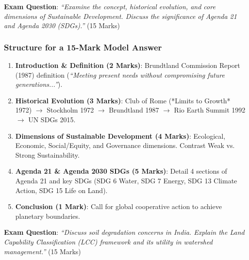 \documentclass[11pt,a4paper]{article}
\begin{document}
\begin{exambox}
\textbf{Exam Question}: \textit{``Examine the concept, historical evolution, and core dimensions of Sustainable Development. Discuss the significance of Agenda 21 and Agenda 2030 (SDGs).''} (15 Marks)
\end{exambox}

\subsubsection{Structure for a 15-Mark Model Answer}
\begin{enumerate}[leftmargin=*]
  \item \textbf{Introduction \& Definition (2 Marks)}: Brundtland Commission Report (1987) definition (\textit{``Meeting present needs without compromising future generations...''}).
  \item \textbf{Historical Evolution (3 Marks)}: Club of Rome (*Limits to Growth* 1972) $\rightarrow$ Stockholm 1972 $\rightarrow$ Brundtland 1987 $\rightarrow$ Rio Earth Summit 1992 $\rightarrow$ UN SDGs 2015.
  \item \textbf{Dimensions of Sustainable Development (4 Marks)}: Ecological, Economic, Social/Equity, and Governance dimensions. Contrast Weak vs. Strong Sustainability.
  \item \textbf{Agenda 21 \& Agenda 2030 SDGs (5 Marks)}: Detail 4 sections of Agenda 21 and key SDGs (SDG 6 Water, SDG 7 Energy, SDG 13 Climate Action, SDG 15 Life on Land).
  \item \textbf{Conclusion (1 Mark)}: Call for global cooperative action to achieve planetary boundaries.
\end{enumerate}

\begin{exambox}
\textbf{Exam Question}: \textit{``Discuss soil degradation concerns in India. Explain the Land Capability Classification (LCC) framework and its utility in watershed management.''} (15 Marks)
\end{exambox}
\end{document}
